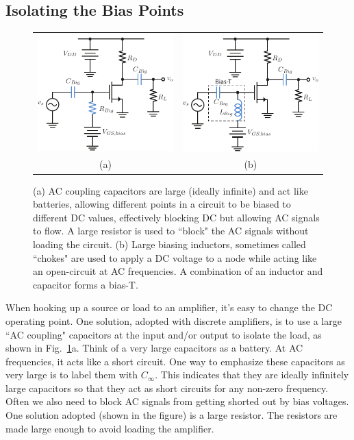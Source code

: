 \subsection{Isolating the Bias Points}
\begin{figure}[tb]
\centering
\begin{tabular}{cc}
\includegraphics[width=.4\columnwidth]{csamp_bias} &
\includegraphics[width=.4\columnwidth]{csamp_biasT}\\
(a) & (b)\\
\end{tabular}
\caption{(a) AC coupling capacitors are large (ideally infinite) and act like batteries, allowing different points in a circuit to be biased to different DC values, effectively blocking DC but allowing AC signals to flow.  A large resistor is used to ``block" the AC signals without loading the circuit.  (b) Large biasing inductors, sometimes called ``chokes" are used to apply a DC voltage to a node while acting like an open-circuit at AC frequencies.  A combination of an inductor and capacitor forms a bias-T.}
\label{fig:ac_couple}
\end{figure}
When hooking up a source or load to an amplifier, it's easy to change the DC operating point.  One solution, adopted with discrete amplifiers, is to use a large ``AC coupling" capacitors at the input and/or output to isolate the load, as shown in Fig.~\ref{fig:ac_couple}a. Think of a very large capacitors as a battery. At AC frequencies, it acts like a short circuit.  One way to emphasize these capacitors as very large is to label them with $C_\infty$. This indicates that they are ideally infinitely large capacitors so that they act as short circuits for any non-zero frequency.  Often we also need to block AC signals from getting shorted out by bias voltages.  One solution adopted (shown in the figure) is a large resistor.  The resistors are made large enough to avoid loading the amplifier.
